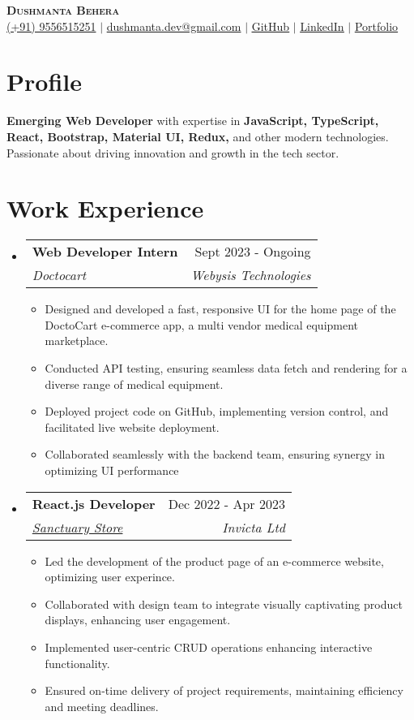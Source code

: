 \documentclass[letterpaper,11pt]{article}
\makeatletter
\newcommand{\resumeItem}[1]{
  \item\small{
    {#1 \vspace{-2pt}}
  }
}
\newcommand{\resumeSubheading}[4]{
  \vspace{-2pt}\item
    \begin{tabular*}{0.97\textwidth}[t]{l@{\extracolsep{\fill}}r}
      \textbf{#1} & #2 \\
      \textit{\small#3} & \textit{\small #4} \\
    \end{tabular*}\vspace{-7pt}
}
\newcommand{\resumeSubHeadingListStart}{\begin{itemize}[leftmargin=0.15in, label={}]}
\newcommand{\resumeSubHeadingListEnd}{\end{itemize}}
\newcommand{\resumeItemListStart}{\begin{itemize}}
\newcommand{\resumeItemListEnd}{\end{itemize}\vspace{-5pt}}
\makeatother
\begin{document}

\begin{center}
   \textbf{\Huge \scshape Dushmanta Behera} \\ \vspace{1pt}
    \small 
    \raisebox{-0.05\height}{\faPhone*} \href{tel:+919556515251}{{(+91) 9556515251}} $|$ 
    \raisebox{-0.05\height}{\faEnvelope} \href{mailto:dushmanta0511@gmail.com}{{dushmanta.dev@gmail.com}} $|$ 
    \raisebox{-0.05\height}{\faGithub} \href{https://github.com/dushmanta05}{{\underline{GitHub}}}
     $|$ 
    \raisebox{-0.05\height}{\faLinkedin} \href{https://www.linkedin.com/in/dushmanta05/}{{\underline{LinkedIn}}}
    $|$ 
    \raisebox{-0.05\height}{\faGlobe} \href{https://dushmanta.is-a.dev/}{{\underline{Portfolio}}}
    
    
\end{center}

\section{Profile}
    
\textbf{Emerging Web Developer} with expertise in \textbf{JavaScript, TypeScript, React, Bootstrap, Material UI, Redux,} and other modern technologies. Passionate about driving innovation and growth in the tech sector.

\section{Work Experience}
  \resumeSubHeadingListStart
  \resumeSubheading
      {Web Developer Intern}{Sept 2023 - Ongoing}
      {{Doctocart}}{Webysis Technologies}
      \resumeItemListStart
       \resumeItem{Designed and developed a fast, responsive UI for the home page of the DoctoCart e-commerce app, a multi vendor medical equipment marketplace.}
        \resumeItem{Conducted API testing, ensuring seamless data fetch and rendering for a diverse range of medical equipment.}
         \resumeItem{Deployed project code on GitHub, implementing version control, and facilitated live website deployment.}
         \resumeItem{Collaborated seamlessly with the backend team, ensuring synergy in optimizing UI performance}
    \resumeItemListEnd
  \resumeSubheading
      {React.js Developer}{Dec 2022 - Apr 2023}
      {\href{https://sanctuarystore.co.nz/} {Sanctuary Store}}{Invicta Ltd}
      \resumeItemListStart
       \resumeItem{Led the development of the product page of an e-commerce website, optimizing user experince.}
        \resumeItem{Collaborated with design team to integrate visually captivating product displays, enhancing user engagement.}
         \resumeItem{Implemented user-centric CRUD operations enhancing interactive functionality.}
         \resumeItem{Ensured on-time delivery of project requirements, maintaining efficiency and meeting deadlines.}
    \resumeItemListEnd
  \resumeSubHeadingListEnd
\end{document}
